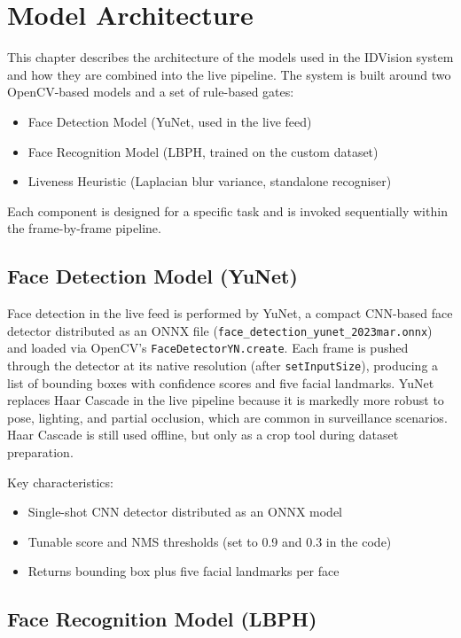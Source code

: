 \documentclass[11pt]{report}
\begin{document}
\section{Model Architecture}

This chapter describes the architecture of the models used in the IDVision system and how they are combined into the live pipeline. The system is built around two OpenCV-based models and a set of rule-based gates:

\begin{itemize}
    \item Face Detection Model (YuNet, used in the live feed)
    \item Face Recognition Model (LBPH, trained on the custom dataset)
    \item Liveness Heuristic (Laplacian blur variance, standalone recogniser)
\end{itemize}

Each component is designed for a specific task and is invoked sequentially within the frame-by-frame pipeline.

\subsection{Face Detection Model (YuNet)}

Face detection in the live feed is performed by YuNet, a compact CNN-based face detector distributed as an ONNX file (\texttt{face\_detection\_yunet\_2023mar.onnx}) and loaded via OpenCV's \texttt{FaceDetectorYN.create}. Each frame is pushed through the detector at its native resolution (after \texttt{setInputSize}), producing a list of bounding boxes with confidence scores and five facial landmarks. YuNet replaces Haar Cascade in the live pipeline because it is markedly more robust to pose, lighting, and partial occlusion, which are common in surveillance scenarios. Haar Cascade is still used offline, but only as a crop tool during dataset preparation.

Key characteristics:
\begin{itemize}
    \item Single-shot CNN detector distributed as an ONNX model
    \item Tunable score and NMS thresholds (set to 0.9 and 0.3 in the code)
    \item Returns bounding box plus five facial landmarks per face
\end{itemize}

\subsection{Face Recognition Model (LBPH)}
\end{document}
